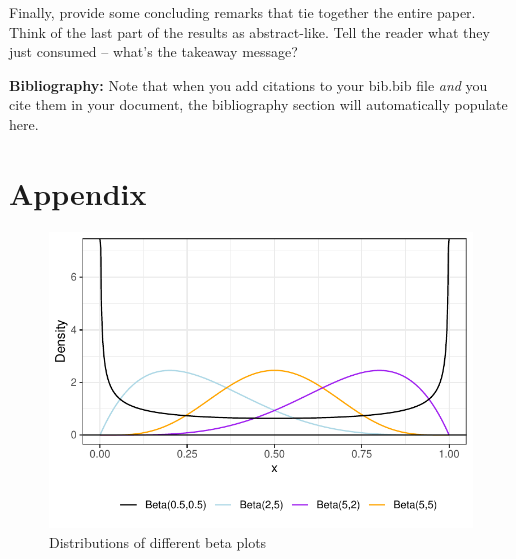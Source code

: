 \documentclass{article}\usepackage[]{graphicx}\usepackage[]{xcolor}
\makeatletter
\def\maxwidth{ %
  \ifdim\Gin@nat@width>\linewidth
    \linewidth
  \else
    \Gin@nat@width
  \fi
}
\newenvironment{knitrout}{}{} %
\makeatother
\begin{document}
\begin{multicols}{2}
Finally, provide some concluding remarks that tie together the entire paper. Think of the last part of the results as abstract-like. Tell the reader what they just consumed -- what's the takeaway message?

\vspace{2em}

\noindent\textbf{Bibliography:} Note that when you add citations to your bib.bib file \emph{and}
you cite them in your document, the bibliography section will automatically populate here.

\begin{tiny}

\end{tiny}


\newpage
\section{Appendix}


\begin{figure}[H]
\begin{center}
\begin{knitrout}
\color{fgcolor}
\includegraphics[width=\maxwidth]{figure/unnamed-chunk-2-1} 
\end{knitrout}
\caption{Distributions of different beta plots}
\label{plot1} 
\end{center}
\end{figure}



\end{multicols}
\end{document}
